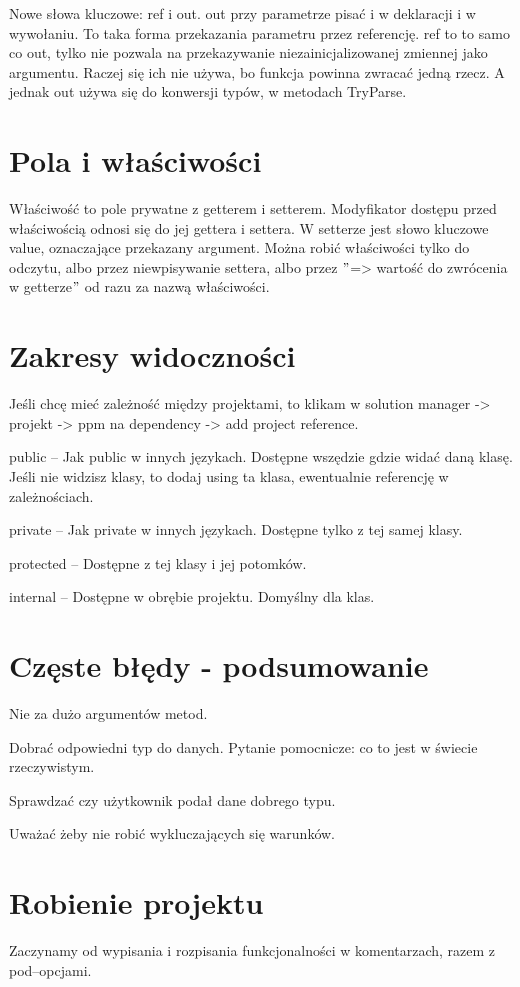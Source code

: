 \documentclass[10pt]{article}
\begin{document}
Nowe słowa kluczowe: ref i out.
out przy parametrze pisać i w deklaracji i w wywołaniu. To taka forma przekazania parametru przez referencję.
ref to to samo co out, tylko nie pozwala na przekazywanie niezainicjalizowanej zmiennej jako argumentu.
Raczej się ich nie używa, bo funkcja powinna zwracać jedną rzecz. A jednak out używa się do konwersji typów, w metodach TryParse.

\section{Pola i właściwości}
Właściwość to pole prywatne z getterem i setterem. Modyfikator dostępu przed właściwością odnosi się do jej gettera i settera. W setterze jest słowo kluczowe value, oznaczające przekazany argument. Można robić właściwości tylko do odczytu, albo przez niewpisywanie settera, albo przez $"$=> wartość do zwrócenia w getterze$"$ od razu za nazwą właściwości.

\section{Zakresy widoczności}
Jeśli chcę mieć zależność między projektami, to klikam w solution manager -> projekt -> ppm na dependency -> add project reference.

public -- Jak public w innych językach. Dostępne wszędzie gdzie widać daną klasę. Jeśli nie widzisz klasy, to dodaj using ta klasa, ewentualnie referencję w zależnościach.

private -- Jak private w innych językach. Dostępne tylko z tej samej klasy.

protected -- Dostępne z tej klasy i jej potomków.

internal -- Dostępne w obrębie projektu. Domyślny dla klas.

\section{Częste błędy - podsumowanie}
Nie za dużo argumentów metod.

Dobrać odpowiedni typ do danych. Pytanie pomocnicze: co to jest w świecie rzeczywistym.

Sprawdzać czy użytkownik podał dane dobrego typu.

Uważać żeby nie robić wykluczających się warunków.

\section{Robienie projektu}
Zaczynamy od wypisania i rozpisania funkcjonalności w komentarzach, razem z pod--opcjami.
\end{document}
